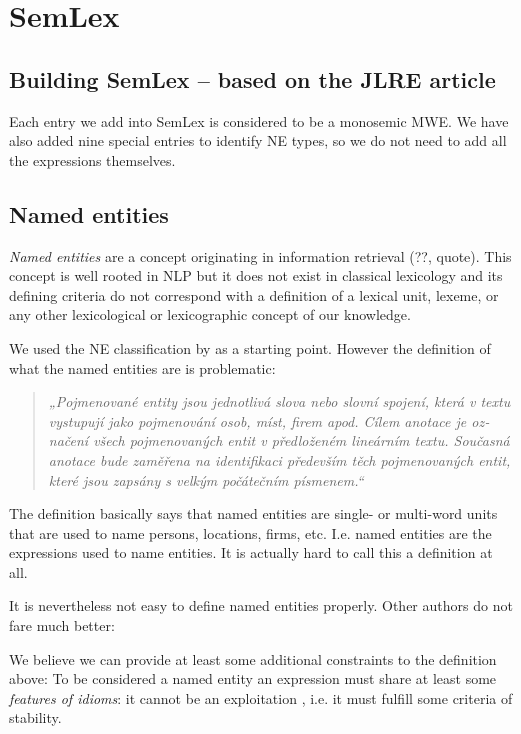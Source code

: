 
\chapter{SemLex}
\label{sec:semlex}

\section{Building SemLex – based on the JLRE article}
\label{sec:semlex:build}
Each entry we add into SemLex is considered to be a monosemic MWE. 
We have also added nine special entries to identify NE types, so we do not need to add all the expressions themselves.

\section{Named entities}
\label{sec:semlex:ne}
\emph{Named entities} are a concept originating in information retrieval (??, quote). This concept is well rooted in NLP but it does not exist in classical lexicology and its defining criteria do not correspond with a definition of a lexical unit, lexeme, or any other lexicological or lexicographic concept of our knowledge.

We used the NE classification by \citet{sevcikova:2007} as a starting point. However the definition of what the named entities are is problematic:
\begin{quote}
\textczech{\em „Pojmenované entity jsou jednotlivá slova nebo slovní spojení, která v textu vystupují jako
pojmenování osob, míst, firem apod. Cílem anotace je označení všech pojmenovaných entit v 
předloženém lineárním textu. Současná anotace bude zaměřena na identifikaci
především těch pojmenovaných entit, které jsou zapsány s velkým počátečním písmenem.“}
\end{quote}
The definition basically says that named entities are single- or multi-word units that are used to name persons, locations, firms, etc. I.e. named entities are the expressions used to name entities. It is actually hard to call this a definition at all.

It is nevertheless not easy to define named entities properly. Other authors do not fare much better: 

We believe we can provide at least some additional constraints to the definition above: To be considered a named entity an expression must share at least some  \emph{features of idioms}: it cannot be an exploitation \citep[see][]{hanks:norms}, i.e. it must fulfill some criteria of stability. 

